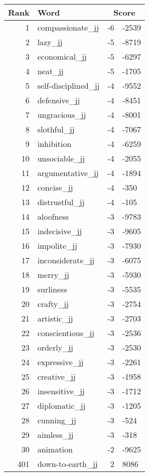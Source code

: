 \begin{longtable}[!htbp]{| rlr@{.}l |}
    \hline
    \textbf{Rank} & \textbf{Word} & \multicolumn{2}{c|}{\textbf{Score}} \\
    \hline
    \endhead
    1 & compassionate\_jj & -6 & -2539 \\
    2 & lazy\_jj & -5 & -8719 \\
    3 & economical\_jj & -5 & -6297 \\
    4 & neat\_jj & -5 & -1705 \\
    5 & self-disciplined\_jj & -4 & -9552 \\
    6 & defensive\_jj & -4 & -8451 \\
    7 & ungracious\_jj & -4 & -8001 \\
    8 & slothful\_jj & -4 & -7067 \\
    9 & inhibition & -4 & -6259 \\
    10 & unsociable\_jj & -4 & -2055 \\
    11 & argumentative\_jj & -4 & -1894 \\
    12 & concise\_jj & -4 & -350 \\
    13 & distrustful\_jj & -4 & -105 \\
    14 & aloofness & -3 & -9783 \\
    15 & indecisive\_jj & -3 & -9605 \\
    16 & impolite\_jj & -3 & -7930 \\
    17 & inconsiderate\_jj & -3 & -6075 \\
    18 & merry\_jj & -3 & -5930 \\
    19 & surliness & -3 & -5535 \\
    20 & crafty\_jj & -3 & -2754 \\
    21 & artistic\_jj & -3 & -2703 \\
    22 & conscientious\_jj & -3 & -2536 \\
    23 & orderly\_jj & -3 & -2530 \\
    24 & expressive\_jj & -3 & -2261 \\
    25 & creative\_jj & -3 & -1958 \\
    26 & insensitive\_jj & -3 & -1712 \\
    27 & diplomatic\_jj & -3 & -1205 \\
    28 & cunning\_jj & -3 & -524 \\
    29 & aimless\_jj & -3 & -318 \\
    30 & animation & -2 & -9625 \\
    401 & down-to-earth\_jj & 2 & 8086 \\

\end{longtable}
